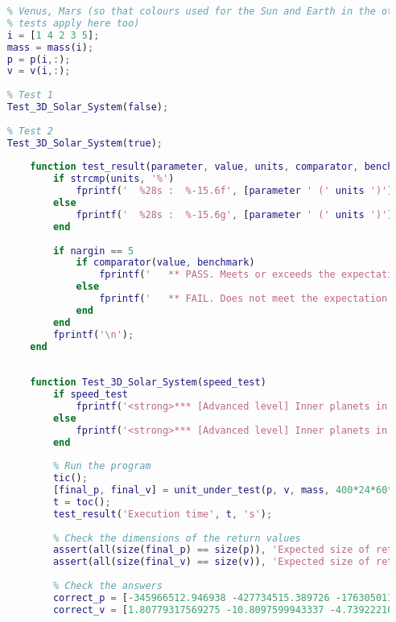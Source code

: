 \begin{lstlisting}[language=Matlab]
    % Use inner planets only; supply them in the order Sun, Earth, Mercury,
    % Venus, Mars (so that colours used for the Sun and Earth in the other
    % tests apply here too)
    i = [1 4 2 3 5];
    mass = mass(i);
    p = p(i,:);
    v = v(i,:);
    
    % Test 1
    Test_3D_Solar_System(false);
    
    % Test 2
    Test_3D_Solar_System(true);
    
        function test_result(parameter, value, units, comparator, benchmark)
            if strcmp(units, '%')
                fprintf('  %28s :  %-15.6f', [parameter ' (' units ')'], value);
            else
                fprintf('  %28s :  %-15.6g', [parameter ' (' units ')'], value);
            end
    
            if nargin == 5
                if comparator(value, benchmark)
                    fprintf('   ** PASS. Meets or exceeds the expectation of %g%s', benchmark, units);
                else
                    fprintf('   ** FAIL. Does not meet the expectation of %g%s', benchmark, units);
                end
            end
            fprintf('\n');
        end
    
    
        function Test_3D_Solar_System(speed_test)
            if speed_test
                fprintf('<strong>*** [Advanced level] Inner planets in 3D (execution speed test)</strong>\n');
            else
                fprintf('<strong>*** [Advanced level] Inner planets in 3D</strong>\n');
            end
    
            % Run the program
            tic();
            [final_p, final_v] = unit_under_test(p, v, mass, 400*24*60*60, speed_test);
            t = toc();
            test_result('Execution time', t, 's');
            
            % Check the dimensions of the return values
            assert(all(size(final_p) == size(p)), 'Expected size of return value "p" to be %ix%i, received %ix%i instead.', size(p,1), size(p,2), size(final_p, 1), size(final_p, 2));
            assert(all(size(final_v) == size(v)), 'Expected size of return value "v" to be %ix%i, received %ix%i instead.', size(v,1), size(v,2), size(final_p, 1), size(final_p, 2));
            
            % Check the answers
            correct_p = [-345966512.946938 -427734515.389726 -176305011.39972;-146624134718.92 23657267681.4718 10263838966.7501;18103318019.8 -57037628697.2036 -32327489902.5598;32774480992.525 -94215943100.9452 -44459425421.2662;-136512481872.172 183605819453.111 87921613716.9978];
            correct_v = [1.80779317569275 -10.8097599943337 -4.73922210995349;-5754.8524496641 -27006.432527836 -11711.495344779;37086.6176187111 15367.1705312566 4360.22910247245;33125.9176644671 10361.9441289187 2564.05625302394;-19228.3713286498 -10562.8647670158 -4323.54314113474];
            

\end{lstlisting}
